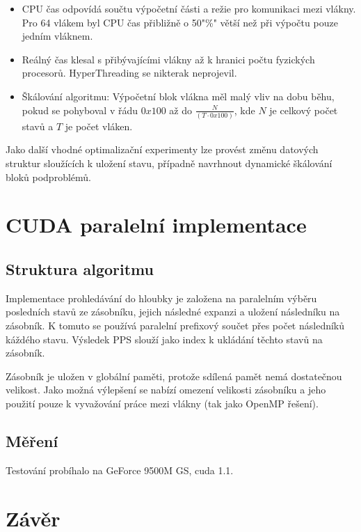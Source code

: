 \documentclass[]{article}
\begin{document}
\begin{itemize}
  \item CPU čas odpovídá součtu výpočetní části a režie pro komunikaci mezi vlákny. Pro 64 vlákem byl CPU čas přibližně o 50"\%" větší než při výpočtu pouze jedním vláknem.
  \item Reálný čas klesal s přibývajícími vlákny až k hranici počtu fyzických procesorů. HyperThreading se nikterak neprojevil.
  \item Škálování algoritmu: Výpočetní blok vlákna měl malý vliv na dobu běhu, pokud se pohyboval v řádu $0x100$ až do $\frac{N}{(T\cdot 0x100)}$, kde $N$ je celkový počet stavů a $T$ je počet vláken.
\end{itemize}

Jako další vhodné optimalizační experimenty lze provést změnu datových struktur sloužících k uložení stavu, případně navrhnout dynamické škálování bloků podproblémů.


\section{CUDA paralelní implementace}

\subsection{Struktura algoritmu}

Implementace prohledávání do hloubky je založena na paralelním výběru posledních stavů ze zásobníku, jejich následné expanzi a uložení následníku na zásobník. K tomuto se používá paralelní prefixový součet přes počet následníků káždého stavu. Výsledek PPS slouží jako index k ukládání těchto stavů na zásobník.

Zásobník je uložen v globální paměti, protože sdílená pamět nemá dostatečnou velikost. Jako možná výlepšení se nabízí omezení velikosti zásobníku a jeho použití pouze k vyvažování práce mezi vlákny (tak jako OpenMP řešení).

\subsection{Měření}

Testování probíhalo na GeForce 9500M GS, cuda 1.1.


\section{Závěr}
\end{document}
